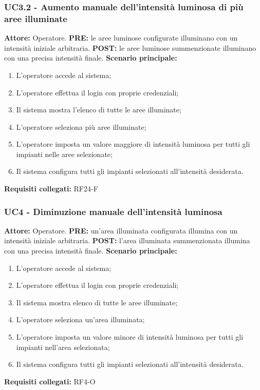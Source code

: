 \documentclass[a4paper, 12pt]{article}
\begin{document}
\subsubsection{UC3.2 - Aumento manuale dell'intensità luminosa di più aree illuminate}
\textbf{Attore:} Operatore.\newline
\textbf{PRE:} le aree luminose configurate illuminano con un intensità iniziale arbitraria.\newline
\textbf{POST:} le aree luminose summenzionate illuminano con una precisa intensità finale.\newline
\textbf{Scenario principale:}
\begin{enumerate}
    \item L'operatore accede al sistema;
    \item L'operatore effettua il login con proprie credenziali;
    \item Il sistema mostra l'elenco di tutte le aree illuminate;
    \item L'operatore seleziona più aree illuminate;
    \item L'operatore imposta un valore maggiore di intensità luminosa per tutti gli impianti nelle aree selezionate;
    \item Il sistema configura tutti gli impianti selezionati all'intensità desiderata.
\end{enumerate}
\textbf{Requisiti collegati:} RF24-F\newline

\subsubsection{UC4 - Diminuzione manuale dell'intensità luminosa}
\textbf{Attore:} Operatore.\newline
\textbf{PRE:} un'area illuminata configurata illumina con un intensità iniziale arbitraria.\newline
\textbf{POST:} l'area illuminata summenzionata illumina con una precisa intensità finale.\newline
\textbf{Scenario principale:}
\begin{enumerate}
    \item L'operatore accede al sistema;
    \item L'operatore effettua il login con proprie credenziali;
    \item Il sistema mostra elenco di tutte le aree illuminate;
    \item L'operatore seleziona un'area illuminata;
    \item L'operatore imposta un valore minore di intensità luminosa per tutti gli impianti nell'area selezionata;
    \item Il sistema configura tutti gli impianti selezionati all'intensità desiderata.
\end{enumerate}
\textbf{Requisiti collegati:} RF4-O\newline
\end{document}
